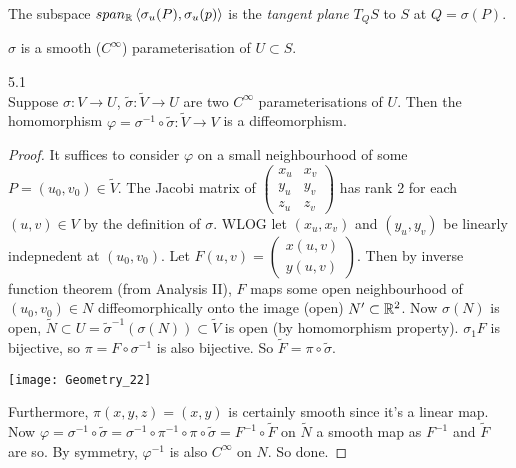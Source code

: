 \documentclass[a4paper]{article}
\begin{document}
The subspace $span_{\mathbb{R}}\left<\sigma_u(P),\sigma_u(p)\right>$ is the \emph{tangent plane} $T_Q S$ to $S$ at $Q=\sigma(P)$.

$\sigma$ is a smooth ($C^\infty$) parameterisation of $U \subset S$.

\begin{prop} 5.1\\
Suppose $\sigma:V \to U$, $\tilde{\sigma}:\tilde{V} \to U$ are two $C^\infty$ parameterisations of $U$. Then the homomorphism $\varphi = \sigma^{-1} \circ \tilde{\sigma}: \tilde{V} \to V$ is a diffeomorphism.
\begin{proof}
It suffices to consider $\varphi$ on a small neighbourhood of some $P = (u_0,v_0) \in \tilde{V}$. The Jacobi matrix of $\left(\begin{matrix}
x_u & x_v\\
y_u & y_v\\
z_u & z_v
\end{matrix}\right)$ has rank 2 for each $(u,v) \in V$ by the definition of $\sigma$. WLOG let $(x_u,x_v)$ and $(y_u,y_v)$ be linearly indepnedent at $(u_0,v_0)$. Let $F(u,v) = \left(\begin{matrix}
x(u,v)\\
y(u,v)
\end{matrix}\right)$. Then by inverse function theorem (from Analysis II), $F$ maps some open neighbourhood of $(u_0,v_0) \in N$ diffeomorphically onto the image (open) $N' \subset \mathbb{R}^2$. Now $\sigma(N)$ is open, $\tilde{N} \subset U = \tilde{\sigma}^{-1} (\sigma(N)) \subset \tilde{V}$ is open (by homomorphism property). $\sigma_1 F$ is bijective, so $\pi = F \circ \sigma^{-1}$ is also bijective. So $\tilde{F} = \pi \circ \tilde{\sigma}$.

\texttt{[image: Geometry\_22]}

Furthermore, $\pi(x,y,z) = (x,y)$ is certainly smooth since it's a linear map. Now $\varphi = \sigma^{-1} \circ \tilde{\sigma} = \sigma^{-1} \circ \pi^{-1} \circ \pi \circ \tilde{\sigma} = F^{-1} \circ \tilde{F}$ on $\tilde{N}$ a smooth map as $F^{-1}$ and $\tilde{F}$ are so. By symmetry, $\varphi^{-1}$ is also $C^\infty$ on $N$. So done.
\end{proof}
\end{prop}
\end{document}
